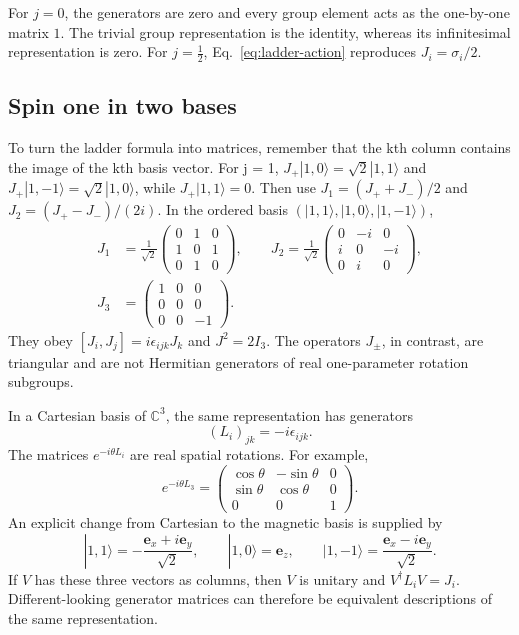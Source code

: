 \documentclass[11pt]{article}
\newcommand{\C}{\mathbb C}
\begin{document}
For \(j=0\), the generators are zero and every group element acts as the
one-by-one matrix \(1\). The trivial group representation is the identity,
whereas its infinitesimal representation is zero. For \(j=\tfrac12\),
Eq.~\eqref{eq:ladder-action} reproduces \(J_i=\sigma_i/2\).

\subsection{Spin one in two bases}
To turn the ladder formula into matrices, remember that the kth column
contains the image of the kth basis vector. For j = 1,
\(J_+|1,0\rangle=\sqrt2|1,1\rangle\) and
\(J_+|1,-1\rangle=\sqrt2|1,0\rangle\), while
\(J_+|1,1\rangle=0\). Then use
\(J_1=(J_++J_-)/2\) and \(J_2=(J_+-J_-)/(2i)\).
In the ordered basis \((|1,1\rangle,|1,0\rangle,|1,-1\rangle)\),
\begin{equation}
 \begin{split}
 J_1&=\frac1{\sqrt2}
 \begin{pmatrix}0&1&0\\1&0&1\\0&1&0\end{pmatrix},\qquad
 J_2=\frac1{\sqrt2}
 \begin{pmatrix}0&-i&0\\i&0&-i\\0&i&0\end{pmatrix},\\
 J_3&=\begin{pmatrix}1&0&0\\0&0&0\\0&0&-1\end{pmatrix}.
 \end{split}
 \label{eq:spin-one-matrices}
\end{equation}
They obey \([J_i,J_j]=i\epsilon_{ijk}J_k\) and \(J^2=2I_3\).
The operators \(J_\pm\), in contrast, are triangular and are not
Hermitian generators of real one-parameter rotation subgroups.

In a Cartesian basis of \(\C^3\), the same representation has generators
\begin{equation}
 (L_i)_{jk}=-i\epsilon_{ijk}.
 \label{eq:cartesian-spin-one}
\end{equation}
The matrices \(e^{-i\theta L_i}\) are real spatial rotations. For example,
\[
 e^{-i\theta L_3}=
 \begin{pmatrix}\cos\theta&-\sin\theta&0\\
 \sin\theta&\cos\theta&0\\0&0&1\end{pmatrix}.
\]
An explicit change from Cartesian to the magnetic basis is supplied by
\[
 |1,1\rangle=-\frac{\bm e_x+i\bm e_y}{\sqrt2},\qquad
 |1,0\rangle=\bm e_z,\qquad
 |1,-1\rangle=\frac{\bm e_x-i\bm e_y}{\sqrt2}.
\]
If \(V\) has these three vectors as columns, then \(V\) is unitary and
\(V^\dagger L_iV=J_i\). Different-looking generator matrices can therefore
be equivalent descriptions of the same representation.
\end{document}
